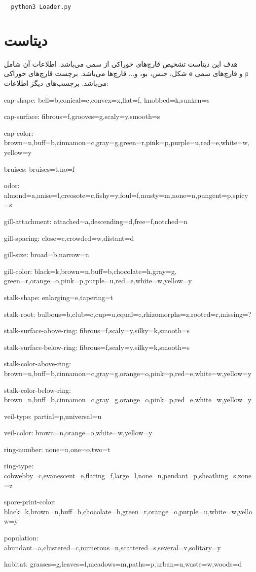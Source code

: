 \begin{latin}
\begin{lstlisting}
  python3 Loader.py
\end{lstlisting}
\end{latin}

\chapter{دیتاست}
هدف این دیتاست تشخیص قارچ‌های خوراکی از سمی می‌باشد.
اطلاعات آن شامل شکل، جنس، بو، و... قارچ‌ها می‌باشد.
برچست قارچ‌های خوراکی
\verb;e;
و قارچ‌های سمی
\verb;p;
می‌باشد.
برچسب‌های دیگز اطلاعات:

\begin{latin}
cap-shape: bell=b,conical=c,convex=x,flat=f, knobbed=k,sunken=s

cap-surface: fibrous=f,grooves=g,scaly=y,smooth=s

cap-color: brown=n,buff=b,cinnamon=c,gray=g,green=r,pink=p,purple=u,red=e,white=w,yellow=y

bruises: bruises=t,no=f

odor: almond=a,anise=l,creosote=c,fishy=y,foul=f,musty=m,none=n,pungent=p,spicy=s

gill-attachment: attached=a,descending=d,free=f,notched=n

gill-spacing: close=c,crowded=w,distant=d

gill-size: broad=b,narrow=n

gill-color: black=k,brown=n,buff=b,chocolate=h,gray=g, green=r,orange=o,pink=p,purple=u,red=e,white=w,yellow=y

stalk-shape: enlarging=e,tapering=t

stalk-root: bulbous=b,club=c,cup=u,equal=e,rhizomorphs=z,rooted=r,missing=?

stalk-surface-above-ring: fibrous=f,scaly=y,silky=k,smooth=s

stalk-surface-below-ring: fibrous=f,scaly=y,silky=k,smooth=s

stalk-color-above-ring: brown=n,buff=b,cinnamon=c,gray=g,orange=o,pink=p,red=e,white=w,yellow=y

stalk-color-below-ring: brown=n,buff=b,cinnamon=c,gray=g,orange=o,pink=p,red=e,white=w,yellow=y

veil-type: partial=p,universal=u

veil-color: brown=n,orange=o,white=w,yellow=y

ring-number: none=n,one=o,two=t

ring-type: cobwebby=c,evanescent=e,flaring=f,large=l,none=n,pendant=p,sheathing=s,zone=z

spore-print-color: black=k,brown=n,buff=b,chocolate=h,green=r,orange=o,purple=u,white=w,yellow=y

population: abundant=a,clustered=c,numerous=n,scattered=s,several=v,solitary=y

habitat: grasses=g,leaves=l,meadows=m,paths=p,urban=u,waste=w,woods=d
\end{latin}

